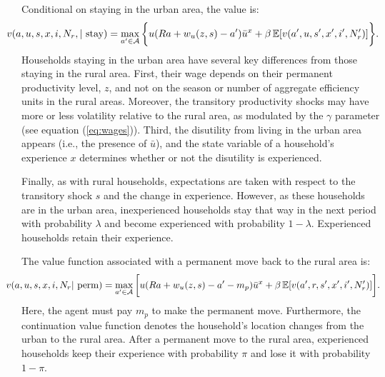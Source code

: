 \documentclass[pdftex,11pt]{article}
\begin{document}
Conditional on staying in the urban area, the value is:
\begin{align}
\hspace{-0.60cm}v(a, u, s, x, i, N_r, | \ \mbox{stay}) =  \max_{a'\in \mathcal{A}}\bigg\{ u(Ra + w_{u}(z,s) - a' )\bar u^{x} + \beta \, \mathbb{E} [v(a',u,s',x',i',N_r')] \bigg\}.
\label{eq:bellman_urban_stay}
\end{align}
Households staying in the urban area have several key differences from those staying in the rural area. First, their wage depends on their permanent productivity level, $z$, and not on the season or number of aggregate efficiency units in the rural areas. Moreover, the transitory productivity shocks may have more or less volatility relative to the rural area, as modulated by the $\gamma$ parameter (see equation (\ref{eq:wages})). Third, the disutility from living in the urban area appears (i.e., the presence of $\bar u$), and the state variable of a household's experience $x$ determines whether or not the disutility is experienced.

Finally, as with rural households, expectations are taken with respect to the transitory shock $s$ and the change in experience. However, as these households are in the urban area, inexperienced households stay that way in the next period with probability $\lambda$ and become experienced with probability $1-\lambda$. Experienced households retain their experience.

The value function associated with a permanent move back to the rural area is:
\begin{align}
\hspace{-0.60cm} v(a, u, s, x, i, N_r | \ \mbox{perm}) = \max_{a'\in \mathcal{A}} \bigg[ u(Ra + w_{u}(z,s) - a' - m_{p} )\bar u^{x} + \beta \, \mathbb{E} [v(a',r, s', x', i',N_r')] \bigg].
\label{eq:bellman_urban_perm_move}
\end{align}
Here, the agent must pay $m_p$ to make the permanent move. Furthermore, the continuation value function denotes the household's location changes from the urban to the rural area. After a permanent move to the rural area, experienced households keep their experience with probability $\pi$ and lose it with probability $1-\pi$.
\end{document}
